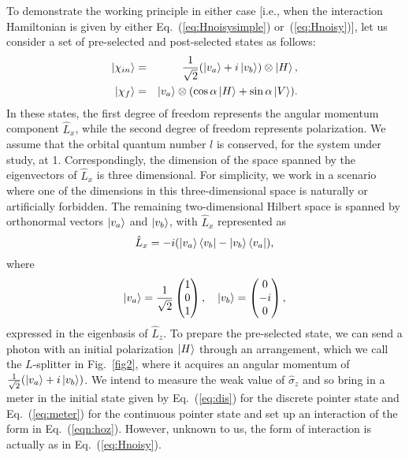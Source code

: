 \documentclass[aps,pra,showpacs,twoside,twocolumn,10pt]{revtex4-1}
\begin{document}
To demonstrate 
the working principle in either case [i.e., when the interaction Hamiltonian is given by either Eq.~(\ref{eq:Hnoisysimple}) or~(\ref{eq:Hnoisy})],
let us consider a set of pre-selected and post-selected states as follows:
\begin{eqnarray}
\ket{\chi_{in}}&=&\frac{1}{\sqrt{2}}(\ket{v_a}+i\ket{v_b})\otimes \ket{H},\nonumber\\
\ket{\chi_f}&=&\ket{v_a} \otimes(\cos\alpha\ket{H}+\sin\alpha\ket{V})
\label{pre_post_noise_1}.
    \end{eqnarray}
In these states, the first degree of freedom represents the angular momentum component \(\hat{L}_x\), while the second degree of freedom represents polarization. We assume that the orbital quantum number \(l\) is conserved, for the system under study, at 1. Correspondingly, the dimension of the space spanned by the eigenvectors of \(\hat{L}_x\) is three dimensional.
For simplicity,
we work in a scenario where one of the dimensions in this three-dimensional space is naturally or artificially forbidden. 
The remaining %
two-dimensional Hilbert space is spanned by orthonormal 
vectors $\ket{v_a}$ and $\ket{v_b}$, with $\hat{L}_x$ represented as
\begin{equation}
    \hat{L}_x=-i(\ket{v_a}\bra{v_b}-\ket{v_b}\bra{v_a}),
\end{equation}
where 
    \begin{eqnarray}
        \ket{v_a}= \frac{1}{\sqrt{2}}\begin{pmatrix} 1 \\ 0 \\ 1
        \end{pmatrix}  , \quad
        \ket{v_b}= \begin{pmatrix} 0 \\- i \\ 0
        \end{pmatrix}, 
    \end{eqnarray}
expressed in the eigenbasis of \(\hat{L}_z\). To prepare the pre-selected state, we can send a photon with an initial polarization $\ket{H}$ through an arrangement, which we call the $L$-splitter  in Fig.~\ref{fig2}, where it acquires an angular momentum of $\frac{1}{\sqrt{2}}(\ket{v_a}+i\ket{v_b})$. We intend to measure the weak value of $\hat{\sigma}_z$ and so bring in a meter in the initial state given by Eq.~(\ref{eq:dis}) for the discrete pointer state and Eq.~(\ref{eq:meter}) for the continuous pointer state and set up an interaction of the form in Eq.~(\ref{eqn:hoz}). However, unknown to us, the form of interaction is actually as in Eq.~(\ref{eq:Hnoisy}). 
\end{document}
